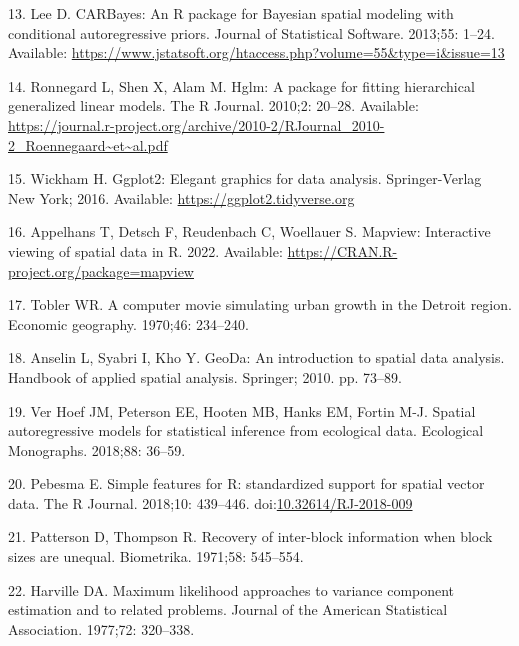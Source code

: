 \documentclass[10pt,letterpaper]{article}
\begin{document}
\leavevmode\hypertarget{ref-lee2013carbayes}{}%
13. Lee D. CARBayes: An R package for Bayesian spatial modeling with
conditional autoregressive priors. Journal of Statistical Software.
2013;55: 1--24. Available:
\url{https://www.jstatsoft.org/htaccess.php?volume=55\&type=i\&issue=13}

\leavevmode\hypertarget{ref-ronnegard2010hglm}{}%
14. Ronnegard L, Shen X, Alam M. Hglm: A package for fitting
hierarchical generalized linear models. The R Journal. 2010;2: 20--28.
Available:
\url{https://journal.r-project.org/archive/2010-2/RJournal_2010-2_Roennegaard~et~al.pdf}

\leavevmode\hypertarget{ref-wickham2016ggplot2}{}%
15. Wickham H. Ggplot2: Elegant graphics for data analysis.
Springer-Verlag New York; 2016. Available:
\url{https://ggplot2.tidyverse.org}

\leavevmode\hypertarget{ref-appelhans2022mapview}{}%
16. Appelhans T, Detsch F, Reudenbach C, Woellauer S. Mapview:
Interactive viewing of spatial data in R. 2022. Available:
\url{https://CRAN.R-project.org/package=mapview}

\leavevmode\hypertarget{ref-tobler1970computer}{}%
17. Tobler WR. A computer movie simulating urban growth in the Detroit
region. Economic geography. 1970;46: 234--240.

\leavevmode\hypertarget{ref-anselin2010geoda}{}%
18. Anselin L, Syabri I, Kho Y. GeoDa: An introduction to spatial data
analysis. Handbook of applied spatial analysis. Springer; 2010. pp.
73--89.

\leavevmode\hypertarget{ref-ver2018spatial}{}%
19. Ver Hoef JM, Peterson EE, Hooten MB, Hanks EM, Fortin M-J. Spatial
autoregressive models for statistical inference from ecological data.
Ecological Monographs. 2018;88: 36--59.

\leavevmode\hypertarget{ref-pebesma2018sf}{}%
20. Pebesma E. Simple features for R: standardized support for spatial
vector data. The R Journal. 2018;10: 439--446.
doi:\href{https://doi.org/10.32614/RJ-2018-009}{10.32614/RJ-2018-009}

\leavevmode\hypertarget{ref-patterson1971recovery}{}%
21. Patterson D, Thompson R. Recovery of inter-block information when
block sizes are unequal. Biometrika. 1971;58: 545--554.

\leavevmode\hypertarget{ref-harville1977maximum}{}%
22. Harville DA. Maximum likelihood approaches to variance component
estimation and to related problems. Journal of the American Statistical
Association. 1977;72: 320--338.
\end{document}
